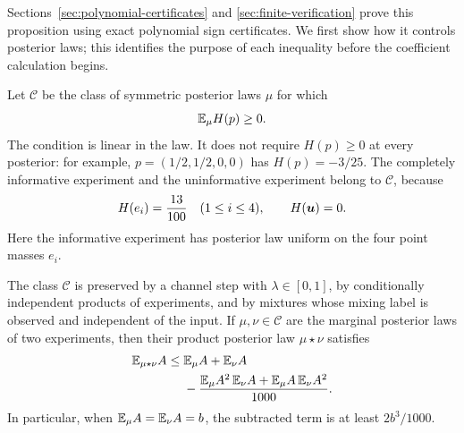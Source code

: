 Sections~\ref{sec:polynomial-certificates} and
\ref{sec:finite-verification} prove this proposition using exact
polynomial sign certificates. We first show how it controls posterior laws;
this identifies the purpose of each inequality before the coefficient
calculation begins.

Let $\mathcal C$ be the class of symmetric posterior laws $\mu$ for which
\begin{equation}\label{eq:cone-condition}
 \mathbb E_{\mu} H(p)\geq0.
\end{equation}
The condition is linear in the law. It does not require $H(p)\geq0$ at
every posterior: for example, $p=(1/2,1/2,0,0)$ has $H(p)=-3/25$.
The completely informative experiment and the uninformative experiment
belong to $\mathcal C$, because
\begin{equation}\label{eq:initial-H}
 H(e_i)=\frac{13}{100}\quad(1\leq i\leq4),\qquad H(\boldsymbol u)=0.
\end{equation}
Here the informative experiment has posterior law uniform on the four
point masses $e_i$.

\begin{proposition}\label{prop:cone-closure}
The class $\mathcal C$ is preserved by a channel step with
$\lambda\in[0,1]$, by conditionally independent products of experiments,
and by mixtures whose mixing label is observed and independent of the
input. If $\mu,\nu\in\mathcal C$ are the marginal posterior laws of two
experiments, then their product posterior law $\mu\star\nu$ satisfies
\begin{align}
 \mathbb E_{\mu\star\nu} A
 \leq{}& \mathbb E_{\mu}A+\mathbb E_{\nu}A\notag\\
 &-\frac{\mathbb E_{\mu}A^2\,\mathbb E_{\nu}A+
                \mathbb E_{\mu}A\,\mathbb E_{\nu}A^2}{1000}.
 \label{eq:moment-saving}
\end{align}
In particular, when $\mathbb E_{\mu}A=\mathbb E_{\nu}A=b$, the subtracted term is at
least $2b^3/1000$.
\end{proposition}

